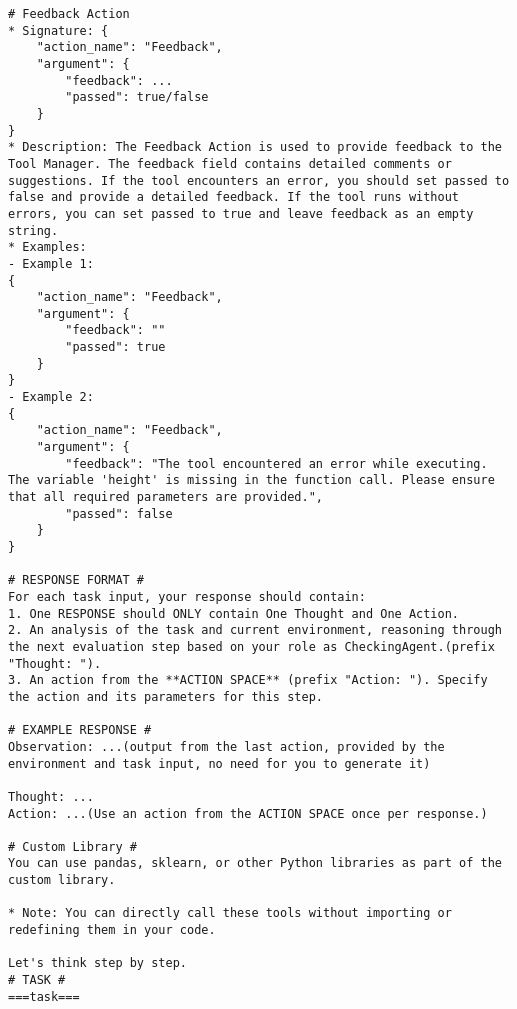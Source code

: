 \begin{tcolorbox}[title=Prompt of Self-Check Step 2, breakable, width=\textwidth,top=0mm]
\begin{Verbatim}[breaklines, fontsize=\footnotesize]
# Feedback Action
* Signature: {
    "action_name": "Feedback",
    "argument": {
        "feedback": ...
        "passed": true/false
    }
}
* Description: The Feedback Action is used to provide feedback to the Tool Manager. The feedback field contains detailed comments or suggestions. If the tool encounters an error, you should set passed to false and provide a detailed feedback. If the tool runs without errors, you can set passed to true and leave feedback as an empty string.
* Examples:
- Example 1:
{
    "action_name": "Feedback",
    "argument": {
        "feedback": ""
        "passed": true
    }
}
- Example 2:
{
    "action_name": "Feedback",
    "argument": {
        "feedback": "The tool encountered an error while executing. The variable 'height' is missing in the function call. Please ensure that all required parameters are provided.",
        "passed": false
    }
}

# RESPONSE FORMAT #
For each task input, your response should contain:
1. One RESPONSE should ONLY contain One Thought and One Action.
2. An analysis of the task and current environment, reasoning through the next evaluation step based on your role as CheckingAgent.(prefix "Thought: ").
3. An action from the **ACTION SPACE** (prefix "Action: "). Specify the action and its parameters for this step.

# EXAMPLE RESPONSE #
Observation: ...(output from the last action, provided by the environment and task input, no need for you to generate it)

Thought: ...
Action: ...(Use an action from the ACTION SPACE once per response.)

# Custom Library #
You can use pandas, sklearn, or other Python libraries as part of the custom library.

* Note: You can directly call these tools without importing or redefining them in your code.

Let's think step by step.
# TASK #
===task===
\end{Verbatim}
\end{tcolorbox}


